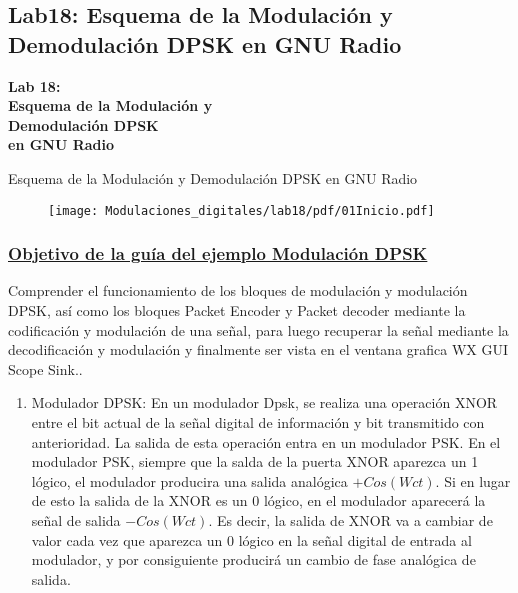 \subsection{Lab18: Esquema de la Modulación y Demodulación DPSK en GNU Radio}
\begin{frame}{}


\bfseries{\textrm{\Large Lab 18:\\ \large Esquema de la Modulación y \\Demodulación DPSK \\en GNU Radio}}
\raggedright
\end{frame}

\begin{frame}{Esquema de la Modulación y Demodulación DPSK en GNU Radio}


\begin{figure}[H]
	\vspace{-3mm}
	\centering
	\texttt{[image: Modulaciones\_digitales/lab18/pdf/01Inicio.pdf]}
\end{figure}
\end{frame}

	\begin{frame}
	\frametitle{\underline{\textbf{Objetivo de la guía del ejemplo Modulación DPSK}}}	
	Comprender el funcionamiento de los bloques de modulación y modulación DPSK, así como los bloques Packet Encoder y Packet decoder mediante la codificación y modulación de una señal, para luego recuperar la señal mediante la decodificación y modulación y finalmente ser vista en el ventana grafica WX GUI Scope Sink..\vspace{2mm}
	\end{frame}

	\begin{frame}
	\begin{enumerate}[1.]
	\frametitle{\underline{\textbf{Guía Ejemplo Modulación DPSK}}}
	\item{Modulador DPSK: En un modulador Dpsk, se realiza una operación XNOR entre el bit actual de la señal digital de información y bit transmitido con anterioridad. La salida de esta operación entra en un modulador PSK. En el modulador PSK, siempre que la salda de la puerta XNOR aparezca un 1 lógico, el modulador producira una salida analógica $+Cos(Wct)$. Si en lugar de esto la salida de la XNOR es un 0 lógico, en el modulador aparecerá la señal de salida $-Cos(Wct)$. Es decir, la salida de XNOR va a cambiar de valor cada vez que aparezca un 0 lógico en la señal digital de entrada al modulador, y por consiguiente producirá un cambio de fase analógica de salida.}\\

	\end{enumerate}
	\end{frame}	
	

